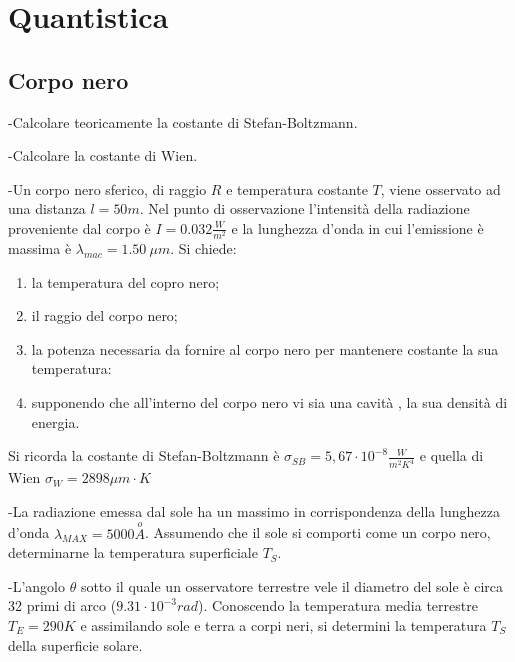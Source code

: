 \documentclass[12pt,twoside,a4]{article}
\begin{document}
\newpage
{}
\section{Quantistica}
\renewcommand{\theindexese}{$\Q$}
\setcounter{subsection}{6}
\subsection{Corpo nero}
\begin{esercizio}
	-Calcolare teoricamente la costante di Stefan-Boltzmann.
	
\end{esercizio}

\begin{esercizio}
	-Calcolare la costante di Wien.
\end{esercizio}

\begin{esercizio}
	-Un corpo nero sferico, di raggio $R$ e temperatura costante $T$, viene osservato ad una distanza $l = 50 m$. Nel punto di osservazione l'intensità  della
radiazione proveniente dal corpo  è $I = 0.032 \frac{W}{m^2}$ e la lunghezza d'onda in cui 
l'emissione è massima è $\lambda_{mac}=1.50 \ \mu m$. Si chiede:
\begin{enumerate}[label=(\textit{\roman*})]
	\item la temperatura del copro nero;
	\item il raggio del corpo nero;
	\item la potenza necessaria da fornire al corpo nero per mantenere costante la sua temperatura:
	\item supponendo che all'interno del corpo nero vi sia una cavità , la sua densità  di energia.
\end{enumerate}
Si ricorda la costante di Stefan-Boltzmann è $\sigma_{SB}=5,67 \cdot 10^{-8} \frac{W}{m^2 K^4}$ e quella di Wien  $\sigma_W =2898 \mu m\cdot K$
\end{esercizio}

\begin{esercizio}
	-La radiazione emessa dal sole ha un massimo in corrispondenza della lunghezza d'onda $\lambda_{MAX}=5000 \overset{o}{A}$. Assumendo che il sole si comporti come un corpo nero, determinarne la temperatura superficiale $T_S$.
\end{esercizio}

\newpage
\begin{esercizio}
	-L'angolo $\theta$ sotto il quale un osservatore terrestre vele il diametro del sole è circa 32 primi di arco ($9.31 \cdot 10^{-3} rad$). Conoscendo la temperatura media terrestre $T_E = 290 K$ e assimilando sole e terra a corpi neri, si determini la temperatura $T_S$ della superficie solare.
\end{esercizio}
\end{document}
